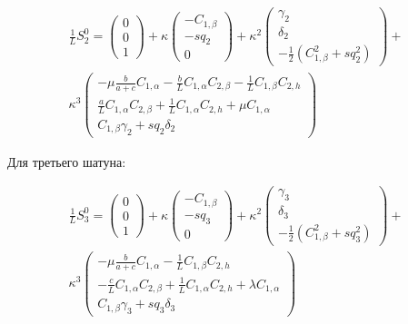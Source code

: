 \begin{equation}
\begin{aligned}
	\frac{1}{L}S_2^0 = \begin{pmatrix} 0 \\ 0 \\ 1\end{pmatrix} + \kappa\begin{pmatrix}-C_{1,\beta} \\ -sq_2 \\ 0 \end{pmatrix} + \kappa^2\begin{pmatrix}\gamma_2 \\ \delta_2 \\ -\frac{1}{2}\left(C^2_{1,\beta} + sq^2_2\right)\end{pmatrix} + \\ \kappa^3\begin{pmatrix}
	-\mu \frac{b}{a+c}C_{1,\alpha} - \frac{b}{L}C_{1,\alpha}C_{2,\beta} - \frac{1}{L}C_{1,\beta}C_{2,h}\\
	\frac{a}{L}C_{1,\alpha}C_{2,\beta} + \frac{1}{L}C_{1,\alpha}C_{2,h} + \mu C_{1,\alpha} \\
	C_{1,\beta}\gamma_2 + sq_2\delta_2
	\end{pmatrix}
\end{aligned}
\end{equation}

Для третьего шатуна:

\begin{equation}
\begin{aligned}
	\frac{1}{L}S_3^0 = \begin{pmatrix} 0 \\ 0 \\ 1\end{pmatrix} + \kappa\begin{pmatrix}-C_{1,\beta} \\ -sq_3 \\ 0 \end{pmatrix} + \kappa^2\begin{pmatrix}\gamma_3 \\ \delta_3 \\ -\frac{1}{2}\left(C^2_{1,\beta} + sq^2_3\right)\end{pmatrix} + \\ \kappa^3\begin{pmatrix}
	-\mu \frac{b}{a+c}C_{1,\alpha} - \frac{1}{L}C_{1,\beta}C_{2,h}\\
	-\frac{c}{L}C_{1,\alpha}C_{2,\beta} + \frac{1}{L}C_{1,\alpha}C_{2,h} + \lambda C_{1,\alpha} \\
	C_{1,\beta}\gamma_3 + sq_3\delta_3
	\end{pmatrix}
\end{aligned}
\end{equation}

